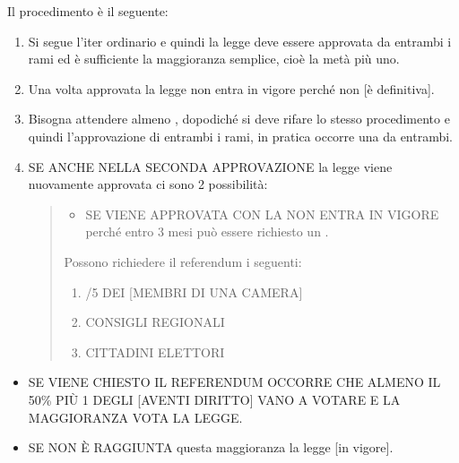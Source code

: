 \documentclass[letterpaper,10pt,italian]{sphinxmanual}
\begin{document}
\sphinxAtStartPar
Il procedimento è il seguente:
\begin{enumerate}
%
\item {} 
\sphinxAtStartPar
Si segue l’iter ordinario e quindi la legge deve essere approvata da entrambi i rami ed è sufficiente la maggioranza semplice, cioè la metà più uno.

\item {} 
\sphinxAtStartPar
Una volta approvata la legge non entra in vigore perché non {[}è definitiva{]}.

\item {} 
\sphinxAtStartPar
Bisogna attendere almeno , dopodiché si deve rifare lo stesso procedimento e quindi l’approvazione di entrambi i rami, in pratica occorre una  da entrambi.

\item {} 
\sphinxAtStartPar
SE ANCHE NELLA SECONDA APPROVAZIONE la legge viene nuovamente approvata ci sono 2 possibilità:
\begin{quote}
\begin{itemize}
\item {} 
\sphinxAtStartPar
SE VIENE APPROVATA CON LA  NON ENTRA IN VIGORE perché entro 3 mesi può essere richiesto un .

\end{itemize}

\sphinxAtStartPar
Possono richiedere il referendum i seguenti:
\begin{enumerate}
%
\item {} 
/5 DEI {[}MEMBRI DI UNA CAMERA{]}

\item {} 
 CONSIGLI REGIONALI

\item {} 
 CITTADINI ELETTORI

\end{enumerate}
\end{quote}

\end{enumerate}
\begin{itemize}
\item {} 
\sphinxAtStartPar
SE VIENE CHIESTO IL REFERENDUM OCCORRE CHE ALMENO IL 50\% PIÙ 1 DEGLI {[}AVENTI DIRITTO{]} VANO A VOTARE E LA MAGGIORANZA VOTA LA LEGGE.

\item {} 
\sphinxAtStartPar
SE NON È RAGGIUNTA questa maggioranza la legge  {[}in vigore{]}.

\end{itemize}
\end{document}
